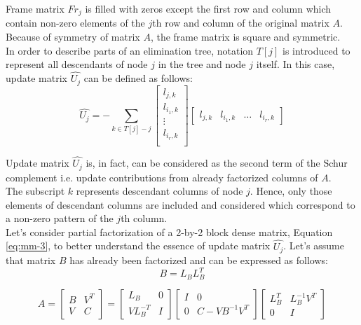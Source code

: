 Frame matrix $Fr_{j}$ is filled with zeros except the first row and column which contain non-zero elements of the $j$th row and column of the original matrix $A$. Because of symmetry of matrix $A$, the frame matrix is square and symmetric.\\

In order to describe parts of an elimination tree, notation $T[j]$ is introduced to represent all descendants of node $j$ in the tree and node $j$ itself. In this case, update matrix $\hat{U_{j}}$ can be defined as follows:\\

\begin{equation} \label{eq:mm-2}
	\hat{U_{j}} = - \sum_{k \in T[j] -{j}}  \begin{bmatrix}
l_{j,k} \\
l_{i_1,k} \\
\vdots \\
l_{i_r,k} \\
\end{bmatrix} \begin{bmatrix}
l_{j,k} & l_{i_1,k} & \dots & l_{i_r,k}
\end{bmatrix} 
\end{equation}


Update matrix $\hat{U_{j}}$ is, in fact, can be considered as the second term of the Schur complement i.e. update contributions from already factorized columns of $A$.\\

The subscript $k$ represents descendant columns of node $j$. Hence, only those elements of descendant columns are included and considered which correspond to a non-zero pattern of the $j$th column.\\

Let's consider partial factorization of a 2-by-2 block dense matrix, Equation \ref{eq:mm-3}, to better understand the essence of update matrix $\hat{U_{j}}$. Let's assume that  matrix $B$ has already been factorized and can be expressed as follows: \\


\begin{equation} \label{eq:mm-4}
	B = L_{B}L^{T}_{B}
\end{equation}


\begin{equation} \label{eq:mm-3}
A = \begin{bmatrix}
B & V^{T} \\
V & C
\end{bmatrix} 
= 
\begin{bmatrix}
L_{B} & 0 \\
VL^{-T}_{B} & I
\end{bmatrix}
\begin{bmatrix}
I & 0 \\
0 & C - VB^{-1}V^{T}
\end{bmatrix} 
\begin{bmatrix}
L^{T}_{B} & L^{-1}_{B}V^{T} \\
0 & I
\end{bmatrix} 
\end{equation}


